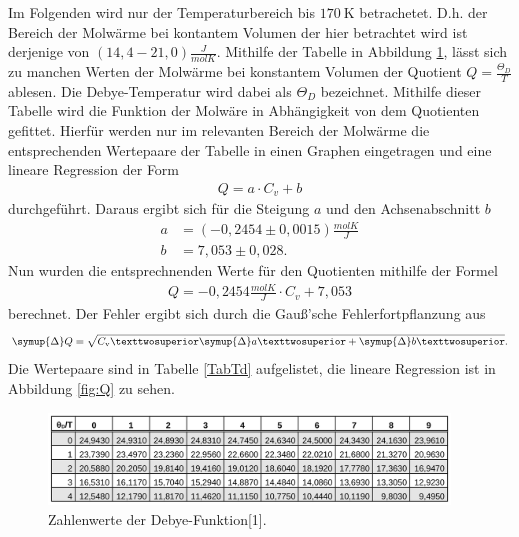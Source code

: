 Im Folgenden wird nur der Temperaturbereich bis $\SI{170}{\kelvin}$ betrachetet. D.h. der Bereich der Molwärme 
bei kontantem Volumen der hier betrachtet wird ist derjenige von $(14,4-21,0) \frac{\si{J}}{\si{mol K}}$.
Mithilfe der Tabelle in Abbildung \ref{fig:Td}, lässt sich zu manchen Werten der Molwärme bei konstantem Volumen
der Quotient $Q=\frac{\Theta_{\si{D}}}{T}$ ablesen. Die Debye-Temperatur wird dabei als $\Theta_{\si{D}}$ 
bezeichnet. Mithilfe dieser Tabelle wird die Funktion 
der Molwäre in Abhängigkeit von dem Quotienten gefittet. Hierfür werden nur im relevanten Bereich der 
Molwärme die entsprechenden Wertepaare der Tabelle in einen Graphen eingetragen und eine lineare Regression 
der Form 
\begin{align*}
    Q = a \cdot C_{\si{v}} + b
\end{align*}
durchgeführt. Daraus ergibt sich für die Steigung $a$ und den Achsenabschnitt $b$
\begin{align*}
    a &= (-0,2454 \pm 0,0015) \frac{\si{molK}}{\si{J}}\\
    b &= 7,053 \pm 0,028.
\end{align*}
Nun wurden die entsprechnenden Werte für den Quotienten mithilfe der Formel 
\begin{align*}
    Q = - 0,2454\frac{\si{molK}}{\si{J}} \cdot C_{\si{v}} + 7,053
\end{align*}
berechnet. Der Fehler ergibt sich durch die Gauß'sche Fehlerfortpflanzung aus
\begin{equation*}
    \symup{\Delta} Q = \sqrt{C_{\si{v}}² \symup{\Delta}a² + \symup{\Delta}b²}.
\end{equation*}
Die Wertepaare sind in Tabelle \ref{TabTd} aufgelistet, die lineare Regression ist in Abbildung 
\ref{fig:Q} zu sehen. 
 
\begin{figure}
  \centering
  \includegraphics[width=0.95\textwidth]{Td1.png}
  \caption{Zahlenwerte der Debye-Funktion[1].}
  \label{fig:Td}
\end{figure}
\FloatBarrier

